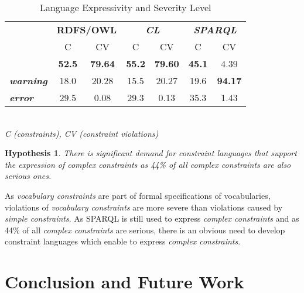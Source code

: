 \documentclass[conference]{IEEEtran}
\newtheorem{hyp}{Hypothesis}
\begin{document}
\begin{table}[H]
		\scriptsize
    \begin{center}
		\caption{Language Expressivity and Severity Level}
		\label{tab:evaluation-expressivity-severity}
    \begin{tabular}{@{}lcccccc@{}}
		\hline
    \multirow{3}{*}{} &
      \multicolumn{2}{c}{\textbf{RDFS/OWL}} &
      \multicolumn{2}{c}{\textbf{\emph{CL}}} &
      \multicolumn{2}{c}{\textbf{\emph{SPARQL}}} \\
    \textbf{} & C & CV & C & CV & C & CV \\
    \hline
		\textbf{\emph{info}} & \textbf{52.5} & \textbf{79.64} & \textbf{55.2} & \textbf{79.60} & \textbf{45.1} & 4.39 \\
		\textbf{\emph{warning}} & 18.0 & 20.28 & 15.5 & 20.27 & 19.6 & \textbf{94.17} \\
		\textbf{\emph{error}} & 29.5 & 0.08 & 29.3 & 0.13 & 35.3 & 1.43 \\
    \bottomrule
    \end{tabular}
		\\ \emph{C (constraints), CV (constraint violations)}
    \end{center}
\end{table}

\begin{hyp}
There is significant demand for constraint languages that support the expression of complex constraints as 44\% of all complex constraints are also serious ones.
\end{hyp}

As \emph{vocabulary constraints} are part of formal specifications of vocabularies,
violations of \emph{vocabulary constraints} are more severe than violations caused by \emph{simple constraints}.
As SPARQL is still used to express \emph{complex constraints} and as 44\% of all \emph{complex constraints} are serious,
there is an obvious need to develop constraint languages which enable to express \emph{complex constraints}.

\section{Conclusion and Future Work}
\end{document}
